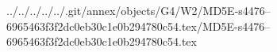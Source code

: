 ../../../../../.git/annex/objects/G4/W2/MD5E-s4476--6965463f3f2dc0eb30c1e0b294780c54.tex/MD5E-s4476--6965463f3f2dc0eb30c1e0b294780c54.tex